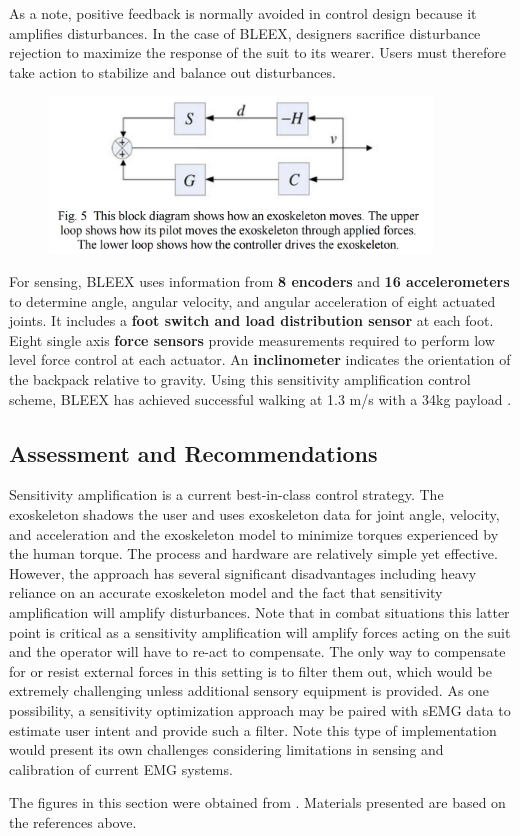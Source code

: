 \begin{refsection}
As a note, positive feedback is normally avoided in control design because it amplifies disturbances.  In the case of BLEEX, designers sacrifice disturbance rejection to maximize the response of the suit to its wearer.  Users must therefore take action to stabilize and balance out disturbances.

\begin{figure}[ht]
  \centering
  \includegraphics[width=4.0in]{exos/figs/bleex_control_diag_3.png}
\end{figure}

For sensing, BLEEX uses information from \textbf{8 encoders} and \textbf{16 accelerometers} to determine angle, angular velocity, and angular acceleration of eight actuated joints. It includes a \textbf{foot switch and load distribution sensor} at each foot. Eight single axis \textbf{force sensors} provide measurements required to perform low level force control at each actuator. An \textbf{inclinometer} indicates the orientation of the backpack relative to gravity. Using this sensitivity amplification control scheme, BLEEX has achieved successful walking at 1.3 m/s with a 34kg payload \cite{sesitivityAmpPaper2005}.

\subsection{Assessment and Recommendations}

Sensitivity amplification is a current best-in-class control strategy.  The exoskeleton shadows the user and uses exoskeleton data for joint angle, velocity, and acceleration and the exoskeleton model to minimize torques experienced by the human torque.  The process and hardware are relatively simple yet effective.   However, the approach has several significant disadvantages including heavy reliance on an accurate exoskeleton model and the fact that sensitivity amplification will amplify disturbances.  Note that in combat situations this latter point is critical as a sensitivity amplification will amplify forces acting on the suit and the operator will have to re-act to compensate.  The only way to compensate for or resist external forces in this setting is to filter them out, which would be extremely challenging unless additional sensory equipment is provided.  As one possibility, a sensitivity optimization approach may be paired with sEMG data to estimate user intent and provide such a filter.  Note this type of implementation would present its own challenges considering limitations in sensing and calibration of current EMG systems. 

\printbibliography[heading=subbibliography]

The figures in this section were obtained from \cite{sesitivityAmpPaper2005}. Materials presented are based on the references above.

\end{refsection}